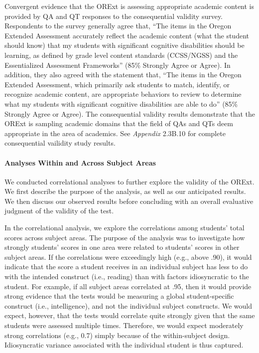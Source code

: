 \documentclass[]{article}
\let\oldparagraph\paragraph
\renewcommand{\paragraph}[1]{\oldparagraph{#1}\mbox{}}
\begin{document}
Convergent evidence that the ORExt is assessing appropriate academic
content is provided by QA and QT responses to the consequential validity
survey. Respondents to the survey generally agree that, ``The items in
the Oregon Extended Assessment accurately reflect the academic content
(what the student should know) that my students with significant
cognitive disabilities should be learning, as defined by grade level
content standards (CCSS/NGSS) and the Essentialized Assessment
Frameworks'' (85\% Strongly Agree or Agree). In addition, they also
agreed with the statement that, ``The items in the Oregon Extended
Assessment, which primarily ask students to match, identify, or
recognize academic content, are appropriate behaviors to review to
determine what my students with significant cognitive disabilities are
able to do'' (85\% Strongly Agree or Agree). The consequential validity
results demonstrate that the ORExt is sampling academic domains that the
field of QAs and QTs deem appropriate in the area of academics. See
\emph{Appendix} 2.3B.10 for complete consequential vailidity study
results.

\hypertarget{analyses-within-and-across-subject-areas}{%
\paragraph{Analyses Within and Across Subject
Areas}\label{analyses-within-and-across-subject-areas}}

We conducted correlational analyses to further explore the validity of
the ORExt. We first describe the purpose of the analysis, as well as our
anticipated results. We then discuss our observed results before
concluding with an overall evaluative judgment of the validity of the
test.

In the correlational analysis, we explore the correlations among
students' total scores across subject areas. The purpose of the analysis
was to investigate how strongly students' scores in one area were
related to students' scores in other subject areas. If the correlations
were exceedingly high (e.g., above .90), it would indicate that the
score a student receives in an individual subject has less to do with
the intended construct (i.e., reading) than with factors idiosyncratic
to the student. For example, if all subject areas correlated at .95,
then it would provide strong evidence that the tests would be measuring
a global student-specific construct (i.e., intelligence), and not the
individual subject constructs. We would expect, however, that the tests
would correlate quite strongly given that the same students were
assessed multiple times. Therefore, we would expect moderately strong
correlations (e.g., 0.7) simply because of the within-subject design.
Idiosyncratic variance associated with the individual student is thus
captured.
\end{document}
